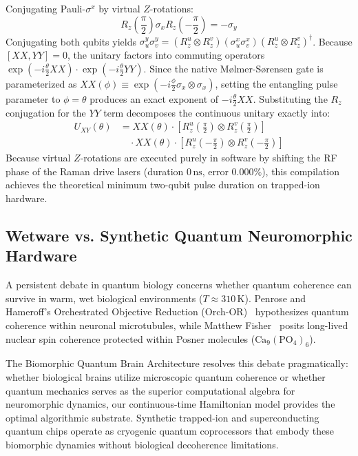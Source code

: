 \documentclass[10pt,twocolumn,3p]{article}
\begin{document}
Conjugating Pauli-$\sigma^x$ by virtual $Z$-rotations:
\begin{equation}
    R_z\left(\frac{\pi}{2}\right) \sigma_x R_z\left(-\frac{\pi}{2}\right) = -\sigma_y
\end{equation}
Conjugating both qubits yields $\sigma_u^y \sigma_v^y = (R_z^u \otimes R_z^v) (\sigma_u^x \sigma_v^x) (R_z^u \otimes R_z^v)^\dagger$. Because $[XX, YY] = 0$, the unitary factors into commuting operators $\exp(-i \frac{\theta}{2} XX) \cdot \exp(-i \frac{\theta}{2} YY)$. Since the native M\o lmer-S\o rensen gate is parameterized as $XX(\phi) \equiv \exp(-i \frac{\phi}{2} \sigma_x \otimes \sigma_x)$, setting the entangling pulse parameter to $\phi = \theta$ produces an exact exponent of $-i \frac{\theta}{2} XX$. Substituting the $R_z$ conjugation for the $YY$ term decomposes the continuous unitary exactly into:
\begin{align}
    U_{XY}(\theta) &= XX(\theta) \cdot \left[ R_z^u\left(\frac{\pi}{2}\right) \otimes R_z^v\left(\frac{\pi}{2}\right) \right] \nonumber \\
    &\quad \cdot XX(\theta) \cdot \left[ R_z^u\left(-\frac{\pi}{2}\right) \otimes R_z^v\left(-\frac{\pi}{2}\right) \right]
    \label{eq:ms_2pulse}
\end{align}
Because virtual $Z$-rotations are executed purely in software by shifting the RF phase of the Raman drive lasers (duration $0\,\text{ns}$, error $0.000\%$), this compilation achieves the theoretical minimum two-qubit pulse duration on trapped-ion hardware.

\subsection{Wetware vs. Synthetic Quantum Neuromorphic Hardware}
\label{subsec:wetware_vs_synthetic}

A persistent debate in quantum biology concerns whether quantum coherence can survive in warm, wet biological environments ($T \approx 310\,\text{K}$). Penrose and Hameroff's Orchestrated Objective Reduction (Orch-OR)~\cite{penrose1996,hameroff2014} hypothesizes quantum coherence within neuronal microtubules, while Matthew Fisher~\cite{fisher2015} posits long-lived nuclear spin coherence protected within Posner molecules ($\text{Ca}_9(\text{PO}_4)_6$).

The Biomorphic Quantum Brain Architecture resolves this debate pragmatically: whether biological brains utilize microscopic quantum coherence or whether quantum mechanics serves as the superior computational algebra for neuromorphic dynamics, our continuous-time Hamiltonian model provides the optimal algorithmic substrate. Synthetic trapped-ion and superconducting quantum chips operate as cryogenic quantum coprocessors that embody these biomorphic dynamics without biological decoherence limitations.
\end{document}
